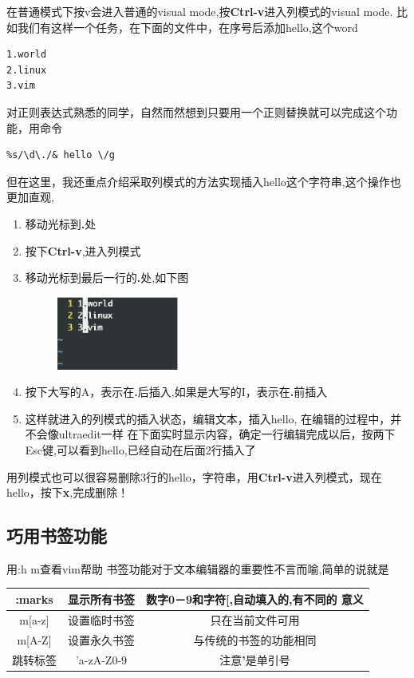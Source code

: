\documentclass[adobefonts]{ctexart}
\begin{document}
在普通模式下按v会进入普通的visual mode,按\textbf{Ctrl-v}进入列模式的visual mode.
比如我们有这样一个任务，在下面的文件中，在序号后添加hello,这个word
\begin{verbatim}
1.world
2.linux
3.vim
\end{verbatim}
对正则表达式熟悉的同学，自然而然想到只要用一个正则替换就可以完成这个功能，用命令
\begin{verbatim}
%s/\d\./& hello \/g 
\end{verbatim}
但在这里，我还重点介绍采取列模式的方法实现插入hello这个字符串,这个操作也更加直观,
\begin{enumerate}
	\item 移动光标到\textbf{.}处
	\item 按下\textbf{Ctrl-v},进入列模式
	\item 移动光标到最后一行的\textbf{.}处,如下图
\begin{figure}[htbp]
\includegraphics[width=4cm]{col-visual-highlight.eps}
\end{figure}
	\item 按下大写的A，表示在\textbf{.}后插入,如果是大写的I，表示在\textbf{.}前插入
	\item 这样就进入的列模式的插入状态，编辑文本，插入hello, 在编辑的过程中，并不会像ultraedit一样
          在下面实时显示内容，确定一行编辑完成以后，按两下Esc键,可以看到hello,已经自动在后面2行插入了
\end{enumerate}

用列模式也可以很容易删除3行的hello，字符串，用\textbf{Ctrl-v}进入列模式，现在hello，按下\textbf{x},完成删除！



\subsection{巧用书签功能}
用:h m查看vim帮助
书签功能对于文本编辑器的重要性不言而喻,简单的说就是


\begin{tabular}{|c|c|c|}
\hline
:marks & 显示所有书签 & 数字0－9和字符[,自动填入的,有不同的 意义\\ \hline
m[a-z] & 设置临时书签 & 只在当前文件可用 \\ \hline
m[A-Z] & 设置永久书签 &  与传统的书签的功能相同\\ \hline
跳转标签 & '{a-zA-Z0-9}   &   注意\textbf{'}是单引号   \\ \hline
\end{tabular}
\end{document}
